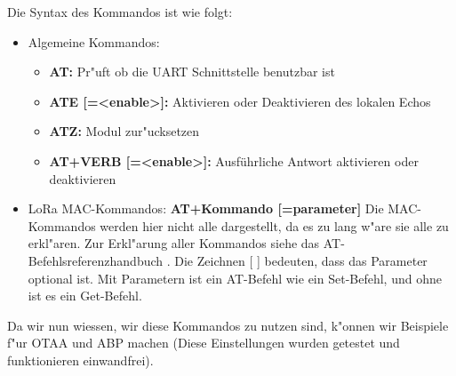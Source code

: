 Die Syntax des Kommandos ist wie folgt: 
 
 \begin{itemize}
 	\item Algemeine Kommandos: 
 	\begin{itemize}
 		\item \textbf{AT:} Pr"uft ob die UART Schnittstelle benutzbar ist
 		\item \textbf{ATE [=<enable>]:}  Aktivieren oder Deaktivieren
 		des lokalen Echos
 		\item \textbf{ATZ:} Modul zur"ucksetzen
 		\item \textbf{AT+VERB [=<enable>]:} Ausführliche Antwort
 		aktivieren oder deaktivieren 
 	\end{itemize}
 	\item LoRa MAC-Kommandos: \textbf{AT+Kommando [=parameter]}
 	Die MAC-Kommandos werden hier nicht alle dargestellt, da es zu lang
 	w"are sie alle zu erkl"aren. Zur Erkl"arung aller Kommandos siehe
 	das AT-Befehlsreferenzhandbuch \cite{AT_Command}.
 	Die Zeichnen [ ] bedeuten, dass das Parameter optional ist. Mit
 	Parametern ist ein AT-Befehl wie ein Set-Befehl, und ohne ist es ein
 	Get-Befehl.
 \end{itemize}  

Da wir nun wiessen, wir diese Kommandos zu nutzen sind, k"onnen wir 
Beispiele f"ur OTAA und ABP machen (Diese Einstellungen wurden getestet
und funktionieren einwandfrei).

